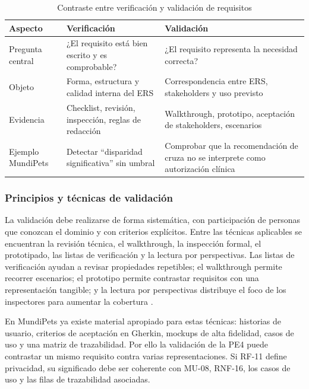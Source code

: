 \documentclass[journal,onecolumn]{IEEEtran}
\begin{document}
	\begin{table}[H]
		\centering
		\caption{Contraste entre verificación y validación de requisitos}
		\label{tab:verif-valid}
		\begin{tabular}{L{2.6cm} L{5.2cm} L{5.2cm}}
			\toprule
			\textbf{Aspecto} & \textbf{Verificación} & \textbf{Validación} \\
			\midrule
			Pregunta central & ¿El requisito está bien escrito y es comprobable? &
			¿El requisito representa la necesidad correcta? \\
			\addlinespace
			Objeto & Forma, estructura y calidad interna del ERS &
			Correspondencia entre ERS, stakeholders y uso previsto \\
			\addlinespace
			Evidencia & Checklist, revisión, inspección, reglas de redacción &
			Walkthrough, prototipo, aceptación de stakeholders, escenarios \\
			\addlinespace
			Ejemplo MundiPets & Detectar ``disparidad significativa'' sin umbral &
			Comprobar que la recomendación de cruza no se interprete como autorización clínica \\
			\bottomrule
		\end{tabular}
	\end{table}
	
	\subsubsection{Principios y técnicas de validación}
	
	La validación debe realizarse de forma sistemática, con participación de personas que conozcan el
	dominio y con criterios explícitos. Entre las técnicas aplicables se encuentran la revisión
	técnica, el walkthrough, la inspección formal, el prototipado, las listas de verificación y la
	lectura por perspectivas. Las listas de verificación ayudan a revisar propiedades repetibles; el
	walkthrough permite recorrer escenarios; el prototipo permite contrastar requisitos con una
	representación tangible; y la lectura por perspectivas distribuye el foco de los inspectores para
	aumentar la cobertura \cite{pohl2025, wiegers2013, ireb31}.
	
	En MundiPets ya existe material apropiado para estas técnicas: historias de usuario, criterios de
	aceptación en Gherkin, mockups de alta fidelidad, casos de uso y una matriz de trazabilidad. Por
	ello la validación de la PE4 puede contrastar un mismo requisito contra varias representaciones.
	Si RF-11 define privacidad, su significado debe ser coherente con MU-08, RNF-16, los casos de uso
	y las filas de trazabilidad asociadas.
	
\end{document}

